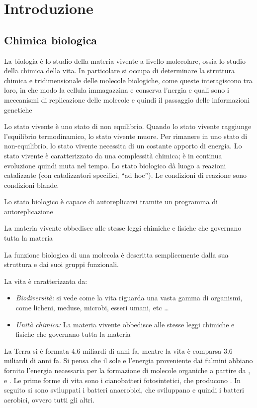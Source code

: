 \part{Introduzione}


\chapter{Chimica biologica}

La biologia è lo studio della materia vivente a livello molecolare,
ossia lo studio della chimica della vita. In particolare si occupa di
determinare la struttura chimica e tridimensionale delle molecole
biologiche, come queste interagiscono tra loro, in che modo la cellula
immagazzina e conserva l'nergia e quali sono i meccanismi di
replicazione delle molecole e quindi il passaggio delle informazioni
genetiche

Lo stato vivente è uno stato di non equilibrio. Quando lo stato vivente
raggiunge l'equilibrio termodinamico, lo stato vivente muore. Per
rimanere in uno stato di non-equilibrio, lo stato vivente necessita di
un costante apporto di energia. Lo stato vivente è caratterizzato da una
complessità chimica; è in continua evoluzione quindi muta nel tempo. Lo
stato biologico dà luogo a reazioni catalizzate (con catalizzatori
specifici, ``ad hoc''). Le condizioni di reazione sono condizioni
blande.

Lo stato biologico è capace di autoreplicarsi tramite un programma di
autoreplicazione

La materia vivente obbedisce alle stesse leggi chimiche e fisiche che
governano tutta la materia

La funzione biologica di una molecola è descritta semplicemente dalla
sua struttura e dai suoi gruppi funzionali.

La vita è caratterizzata da:
\begin{itemize}
\item \emph{Biodiversità:} si vede come la vita
riguarda una vasta gamma di organismi, come licheni, meduse, microbi,
esseri umani, etc \ldots{}
\item \emph{Unità chimica:} La materia vivente obbedisce
alle stesse leggi chimiche e fisiche che governano tutta la materia
\end{itemize}

La Terra si è formata 4.6 miliardi di anni fa, mentre la vita è comparsa
3.6 miliardi di anni fa. Si pensa che il sole e l'energia proveniente
dai fulmini abbiano fornito l'energia necessaria per la formazione di
molecole organiche a partire da , e . Le prime
forme di vita sono i cianobatteri fotosintetici, che producono .
In seguito si sono sviluppati i batteri anaerobici, che sviluppano
 e quindi i batteri aerobici, ovvero tutti gli altri.

